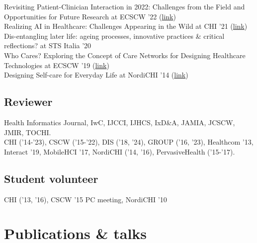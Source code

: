 \documentclass[11pt, a4paper]{article} %
\newcommand{\years}[1]{\marginnote{\scriptsize #1}} %
\begin{document}
\years{2022}Revisiting Patient-Clinician Interaction in 2022: Challenges from the Field and Opportunities for Future Research at ECSCW '22 (\href{http://francisconunes.me/RevisitingPatientClinicianInteractionWS/index.html}{link})\\
\years{2021}Realizing AI in Healthcare: Challenges Appearing in the Wild at CHI '21 (\href{http://francisconunes.me/RealizingAIinHealthcareWS/index.html}{link})\\
\years{2020}Dis-entangling later life: ageing processes, innovative practices \& critical reflections? at STS Italia '20\\
\years{2019}Who Cares? Exploring the Concept of Care Networks for Designing Healthcare Technologies at ECSCW '19 (\href{http://francisconunes.me/CareNetworksWS/}{link})\\
\years{2014}Designing Self-care for Everyday Life at NordiCHI '14 (\href{https://designingselfcareforeverydaylife.wordpress.com/}{link})

\subsection*{Reviewer}

Health Informatics Journal, IwC, IJCCI, IJHCS, IxD\&A, JAMIA, JCSCW, JMIR, TOCHI.\\
CHI ('14-'23), CSCW ('15-'22), DIS ('18, '24), GROUP ('16, '23), Healthcom '13, Interact '19, MobileHCI '17, NordiCHI ('14, '16), PervasiveHealth ('15-'17).

\subsection*{Student volunteer}

CHI ('13, '16), CSCW '15 PC meeting, NordiCHI '10






\section*{Publications \& talks}
\end{document}
